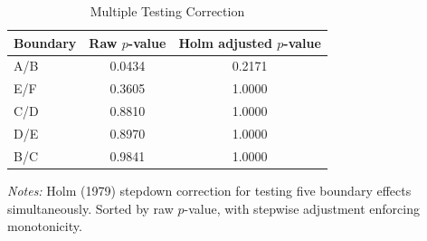 \begin{table}[htbp]
\centering
\caption{Multiple Testing Correction}
\label{tab:romano_wolf}
\begin{tabular}{lcc}
\toprule
Boundary & Raw $p$-value & Holm adjusted $p$-value \\
\midrule
A/B & 0.0434 & 0.2171 \\
E/F & 0.3605 & 1.0000 \\
C/D & 0.8810 & 1.0000 \\
D/E & 0.8970 & 1.0000 \\
B/C & 0.9841 & 1.0000 \\
\bottomrule
\end{tabular}
\begin{minipage}{\textwidth}
\footnotesize
\textit{Notes:} Holm (1979) stepdown correction for testing five boundary effects simultaneously.
Sorted by raw $p$-value, with stepwise adjustment enforcing monotonicity.
\end{minipage}
\end{table}
